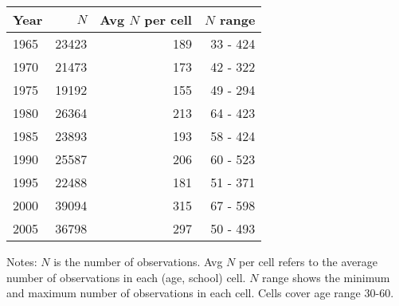 \begin{tabular}{lrrr}
\hline
Year & $N$  & Avg $N$ per cell  & $N$ range  \\ 
\hline
1965 & 23423  & 189  & 33 - 424  \\ 
1970 & 21473  & 173  & 42 - 322  \\ 
1975 & 19192  & 155  & 49 - 294  \\ 
1980 & 26364  & 213  & 64 - 423  \\ 
1985 & 23893  & 193  & 58 - 424  \\ 
1990 & 25587  & 206  & 60 - 523  \\ 
1995 & 22488  & 181  & 51 - 371  \\ 
2000 & 39094  & 315  & 67 - 598  \\ 
2005 & 36798  & 297  & 50 - 493  \\ 
\hline
\end{tabular}%

 \vspace{5 mm} 
\small 
Notes: $N$ is the number of observations. 
Avg $N$ per cell refers to the average number of observations in each (age, school) cell. 
$N$ range shows the minimum and maximum number of observations in each cell. 
Cells cover age range 30-60.
\normalsize 
